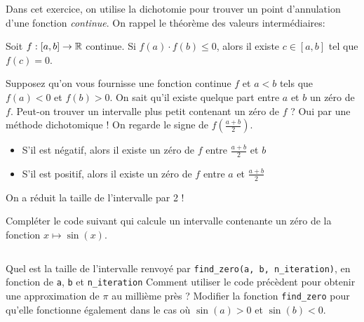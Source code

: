 \exo
\begin{enonce}
	Dans cet exercice, on utilise la dichotomie pour trouver un point d'annulation d'une fonction \emph{continue}. On rappel le théorème des valeurs intermédiaires:
	\begin{theorem}
		Soit $ f: [a,b] \rightarrow \mathbb{R} $ continue. Si $ f(a) \cdot f(b) \leq 0 $, alors il existe $ c \in [a, b] $ tel que $ f(c) = 0 $.
	\end{theorem}
	Supposez qu'on vous fournisse une fonction continue $ f $ et $ a < b $ tels que $ f(a)<0$ et $ f(b) > 0 $. On sait qu'il existe quelque part entre $ a $ et $ b $ un zéro de $ f $. Peut-on trouver un intervalle plus petit contenant un zéro de $ f $ ? Oui par une méthode dichotomique ! On regarde le signe de $ f(\frac{a+b}{2}) $.
	\begin{itemize}
		\item S'il est négatif, alors il existe un zéro de $ f $ entre $ \frac{a+b}{2} $ et $ b $
		\item S'il est positif, alors il existe un zéro de $ f $ entre $ a $ et $ \frac{a+b}{2} $
	\end{itemize}
	On a réduit la taille de l'intervalle par 2 !

	\quessques Compléter le code suivant qui calcule un intervalle contenante un zéro de la fonction $ x \mapsto \sin(x) $.
	\inputminted{python}{minted/9/find_zero.py}
	\ssques Quel est la taille de l'intervalle renvoyé par \texttt{find\_zero(a, b, n\_iteration)}, en fonction de \texttt{a}, \texttt{b} et \texttt{n\_iteration}
	\ssques Comment utiliser le code précèdent pour obtenir une approximation de $ \pi $ au millième près ?
	\ques Modifier la fonction  \texttt{find\_zero} pour qu'elle fonctionne également dans le cas où $ \sin(a) > 0 $ et $ \sin(b) < 0$.
\end{enonce}
